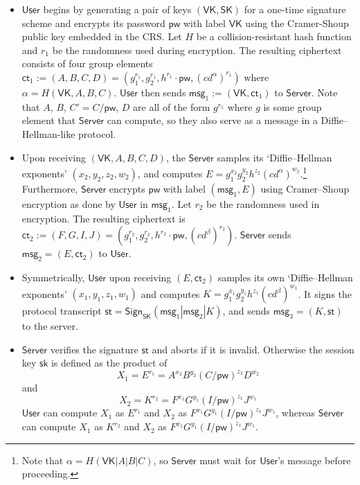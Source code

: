 \documentclass[10pt,a4paper]{article}
\newcommand{\user}{\mathsf{User}}
\newcommand{\sk}{\mathsf{sk}}
\newcommand{\pw}{\mathsf{pw}}
\newcommand{\VK}{\mathsf{VK}}
\newcommand{\SK}{\mathsf{SK}}
\newcommand{\server}{\mathsf{Server}}
\newcommand{\msg}[1]{\mathsf{msg}_{#1}}
\newcommand{\ct}{\mathsf{ct}}
\newcommand{\st}{\mathsf{st}}
\newcommand{\sign}{\mathsf{Sign}}
\begin{document}
\begin{itemize}
  \item $\user$ begins by generating a pair of keys $(\VK,\SK)$ for a one-time signature scheme and encrypts its password $\pw$ with label $\VK$ using the Cramer-Shoup public key embedded in the CRS. Let $H$ be a collision-resistant hash function and $r_1$ be the randomness used during encryption. The resulting ciphertext consists of four group elements $\ct_1 := (A,B,C,D) = (g_1^{r_1}, g_2^{r_1}, h^{r_1} \cdot\pw, (cd^\alpha)^{r_1})$ where $\alpha = H(\VK, A, B, C)$. $\user$ then sends $\msg{1} := (\VK, \ct_1)$ to $\server$. Note that $A$, $B$, $C' = C/\pw$, $D$ are all of the form $g^{r_1}$ where $g$ is some group element that $\server$ can compute, so they also serve as a message in a Diffie--Hellman-like protocol.
  
  \item Upon receiving $(\VK,A,B,C,D)$, the $\server$ samples its `Diffie--Hellman exponents' $(x_2, y_2, z_2, w_2)$, and computes $E = g_1^{x_2}g_2^{y_2}h^{z_2}(cd^\alpha)^{w_2}$.\footnote{Note that $\alpha = H(\VK|A|B|C)$, so $\server$ must wait for $\user$'s message before proceeding.} Furthermore, $\server$ encrypts $\pw$ with label $(\msg{1}, E)$ using Cramer--Shoup encryption as done by $\user$ in $\msg{1}$. Let $r_2$ be the randomness used in encryption. The resulting ciphertext is $\ct_2:=(F,G,I,J) = (g_1^{r_2}, g_2^{r_2}, h^{r_2} \cdot\pw, (cd^\beta)^{r_2})$. $\server$ sends $\msg{2} = (E,\ct_2)$ to $\user$.
  
  \item Symmetrically, $\user$ upon receiving $(E,\ct_2)$ samples its own `Diffie--Hellman exponents' $(x_1,y_1,z_1,w_1)$ and computes $K = g_1^{x_1}g_2^{y_1}h^{z_1}(cd^\beta)^{w_1}$. It signs the protocol transcript $\st = \sign_\SK(\msg{1}|\msg{2}|K)$, and sends $\msg{3} = (K, \st)$ to the server.
  
  \item $\server$ verifies the signature $\st$ and aborts if it is invalid. Otherwise the session key $\sk$ is defined as the product of
      \[
      X_1 = E^{r_1} = A^{x_2}B^{y_2}(C/\pw)^{z_2}D^{w_2}
      \]
      and
      \[
      X_2 = K^{r_2} = F^{x_1}G^{y_1}(I/\pw)^{z_1}J^{w_1}
      \]
      $\user$ can compute $X_1$ as $E^{r_1}$ and $X_2$ as $F^{x_1}G^{y_1}(I/\pw)^{z_1}J^{w_1}$, whereas $\server$ can compute $X_1$ as $K^{r_2}$ and $X_2$ as $F^{x_1}G^{y_1}(I/\pw)^{z_1}J^{w_1}$.
\end{itemize}
\end{document}
